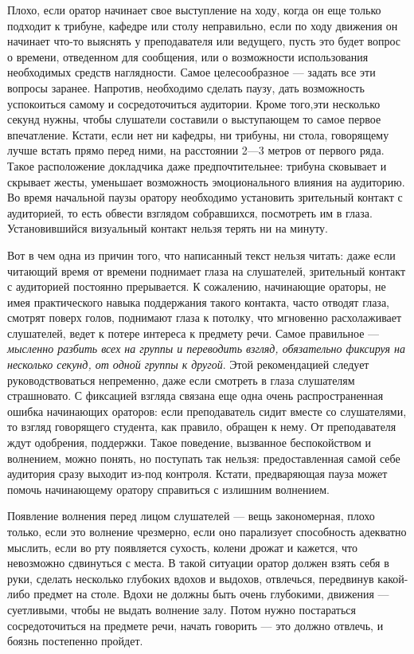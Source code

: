 Плохо, если оратор начинает свое выступление на ходу, когда он еще только подходит к трибуне, кафедре или столу неправильно, если по ходу движения он начинает что-то выяснять у преподавателя или ведущего, пусть это будет вопрос о времени, отведенном для сообщения, или о возможности использования необходимых средств наглядности. Самое целесообразное — задать все эти вопросы заранее. Напротив, необходимо сделать паузу, дать возможность успокоиться самому и сосредоточиться аудитории. 
Кроме того,эти несколько секунд нужны, чтобы слушатели составили о выступающем то самое первое впечатление. Кстати, если нет ни кафедры, ни трибуны, ни стола, говорящему лучше встать прямо перед ними, на расстоянии 2—3 метров от первого ряда. 
Такое расположение докладчика даже предпочтительнее: трибуна сковывает и скрывает жесты, уменьшает возможность эмоционального влияния на аудиторию. 
Во время начальной паузы оратору необходимо установить зрительный контакт с аудиторией, то есть обвести взглядом
собравшихся, посмотреть им в глаза.
Установившийся визуальный контакт нельзя терять ни на минуту. 

Вот в чем одна из причин того, что написанный текст нельзя читать: даже если читающий время от времени поднимает глаза на слушателей, зрительный контакт с аудиторией постоянно прерывается. 
К сожалению, начинающие ораторы, не имея практического навыка поддержания такого контакта, часто отводят глаза, смотрят поверх голов, поднимают глаза к потолку, что мгновенно расхолаживает слушателей, ведет к потере интереса к предмету речи.
Самое правильное — \textit{мысленно разбить всех на группы и переводить взгляд, обязательно фиксируя на несколько секунд, от одной группы к другой}. 
Этой рекомендацией следует руководствоваться непременно, даже если смотреть в глаза слушателям страшновато. 
С фиксацией взгляда связана еще одна очень распространенная ошибка начинающих ораторов: если преподаватель сидит вместе со слушателями, то взгляд говорящего студента, как правило,
обращен к нему.
От преподавателя ждут одобрения, поддержки. 
Такое поведение, вызванное беспокойством и волнением, можно понять, но поступать так нельзя: предоставленная самой себе аудитория сразу выходит из-под контроля. 
Кстати, предваряющая пауза может помочь начинающему оратору справиться с излишним волнением. 

Появление волнения перед лицом слушателей — вещь закономерная, плохо только, если это волнение чрезмерно, если оно парализует способность адекватно мыслить, если во рту появляется сухость, колени дрожат и кажется, что невозможно сдвинуться с места. 
В такой ситуации оратор должен взять себя в руки, сделать несколько глубоких вдохов и выдохов, отвлечься, передвинув какой-либо предмет на столе. 
Вдохи не должны быть очень глубокими, движения — суетливыми, чтобы не выдать волнение залу. 
Потом нужно постараться сосредоточиться на предмете речи, начать говорить — это должно отвлечь, и боязнь постепенно пройдет. 

